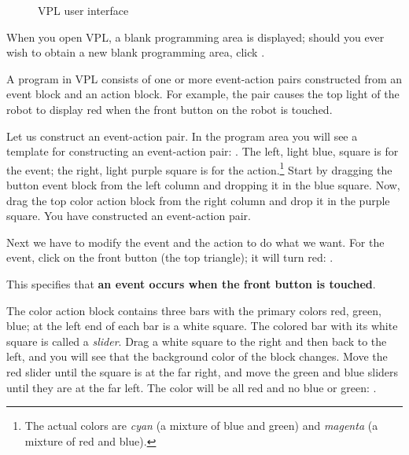 \begin{figure}[hbt]
\caption{VPL user interface}\label{fig.gui}
\end{figure}



When you open VPL, a blank programming area is displayed; should you
ever wish to obtain a new blank programming area, click .

A program in VPL consists of one or more event-action pairs constructed
from an event block and an action block. For example, the pair
 causes the top light of the robot to display red when the
front button on the robot is touched.


Let us construct an event-action pair. In the program area you will see
a template for constructing an event-action pair:
. The left, light blue, square is for the
event; the right, light purple square is for the action.\footnote{The
actual colors are \textit{cyan} (a mixture of blue and green) and
\textit{magenta} (a mixture of red and blue).} Start by dragging the
button event block  from the left column and dropping
it in the blue square. Now, drag the top color action block
 from the right column and drop it in the purple
square. You have constructed an event-action pair.

Next we have to modify the event and the action to do what we want. For
the event, click on the front button (the top triangle); it will turn
red: .

This specifies that \textbf{an event occurs when the front button is touched}.

The color action block contains three bars with the primary colors red,
green, blue; at the left end of each bar is a white square. The colored
bar with its white square is called a \emph{slider}. Drag a white square
to the right and then back to the left, and you will see that the
background color of the block changes. Move the red slider until the
square is at the far right, and move the green and blue sliders until
they are at the far left. The color will be all red and no blue or
green: .


